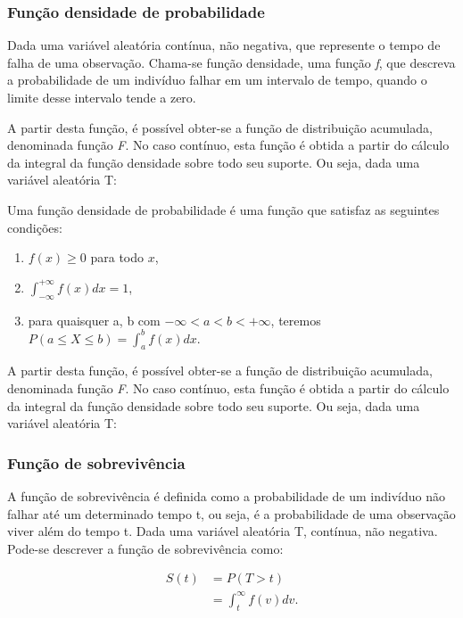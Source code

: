 \documentclass[a4paper,12pt]{article}
\begin{document}
\subsubsection{Função densidade de probabilidade}

 Dada uma variável aleatória contínua, não negativa, que represente o tempo de falha de uma observação. Chama-se função densidade, uma função \textit{f}, que descreva a probabilidade de um indivíduo falhar em um intervalo de tempo, quando o limite desse intervalo tende a zero.%

A partir desta função, é possível obter-se a função de distribuição acumulada, denominada função \textit{F}. No caso contínuo, esta função é obtida a partir do cálculo da integral da função densidade sobre todo seu suporte. Ou seja, dada uma variável aleatória T:

Uma função densidade de probabilidade é uma função que satisfaz as seguintes condições:%

\begin{enumerate}

	\item $f(x) \ge 0$ para todo $x$,
	\item $\int_{-\infty}^{+\infty} f(x)dx = 1$,
	\item para quaisquer a, b com $-\infty < a < b < +\infty$, teremos $P(a \le X \le b) = \int_a^b f(x)dx$.
\end{enumerate}

A partir desta função, é possível obter-se a função de distribuição acumulada, denominada função \textit{F}. No caso contínuo, esta função é obtida a partir do cálculo da integral da função densidade sobre todo seu suporte. Ou seja, dada uma variável aleatória T:

		
\subsubsection{Função de sobrevivência}

A função de sobrevivência é definida como a probabilidade de um indivíduo não falhar até um determinado tempo t, ou seja, é a probabilidade de uma observação viver além do tempo t. Dada uma variável aleatória T, contínua, não negativa. Pode-se descrever a função de sobrevivência como:

\begin{equation}
\label{eq}
	\begin{split}
		S(t) & = P(T > t) \\
		& = \int_t^{\infty} f(v)dv.
  	\end{split}
\end{equation} 
\end{document}
